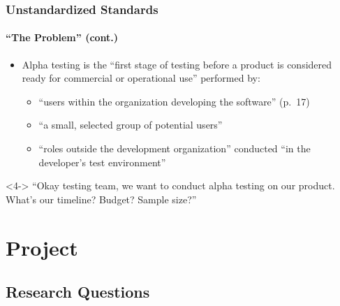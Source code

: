 \documentclass{beamer}
\newcommand{\citepISTQB}{\citepalias[\citeyear{ISTQB}]{ISTQB}}
\begin{document}
\begin{frame}
    \frametitle{Unstandardized Standards}
    \framesubtitle{``The Problem'' (cont.)}
    \begin{itemize}
        \item Alpha testing is the ``first stage of testing before a product is
              considered ready for commercial or operational use''
              \citep[p.~17]{IEEE2017} performed by:
              \begin{itemize}
                  \item ``users within the organization developing
                        the software'' (p.~17)
                  \item<2-> ``a small, selected group of
                        potential users'' \citep[p.~5-8]{SWEBOK2024}
                  \item<3-> ``roles outside the development organization'' conducted
                        ``in the developer's test environment'' \citepISTQB{}
              \end{itemize}
    \end{itemize}

    \begin{block}<4->{}
        {``Okay testing team, we want to conduct alpha testing on our
            product. What's our timeline? Budget? Sample size?''}
    \end{block}
\end{frame}


\section{Project}
\subsection{Research Questions}

\def\rqa{\begin{alertblock}{Research Question 1}
        \rqatext{}
    \end{alertblock}
}

\def\rqb{\begin{alertblock}{Research Question 2}
        \rqbtext{}
    \end{alertblock}
}
\end{document}
